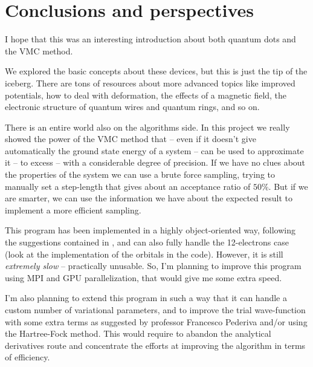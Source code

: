 
\chapter{Conclusions and perspectives}
I hope that this was an interesting introduction about both quantum dots and the VMC method.

We explored the basic concepts about these devices, but this is just the tip of the iceberg. There are tons of resources about more advanced topics like improved potentials, how to deal with deformation, the effects of a magnetic field, the electronic structure of quantum wires and quantum rings, and so on.

There is an entire world also on the algorithms side. In this project we really showed the power of the VMC method that -- even if it doesn't give automatically the ground state energy of a system -- can be used to approximate it -- to excess -- with a considerable degree of precision. If we have no clues about the properties of the system we can use a brute force sampling, trying to manually set a step-length that gives about an acceptance ratio of $50\%$. But if we are smarter, we can use the information we have about the expected result to implement a more efficient sampling.

This program has been implemented in a highly object-oriented way, following the suggestions contained in \cite{Hoegberget2013}, and can also fully handle the 12-electrons case (look at the implementation of the orbitals in the code). However, it is still \emph{extremely slow} -- practically unusable. So, I'm planning to improve this program using MPI and GPU parallelization, that would give me some extra speed.

I'm also planning to extend this program in such a way that it can handle a custom number of variational parameters, and to improve the trial wave-function with some extra terms as suggested by professor Francesco Pederiva and/or using the Hartree-Fock method. This would require to abandon the analytical derivatives route and concentrate the efforts at improving the algorithm in terms of efficiency.

